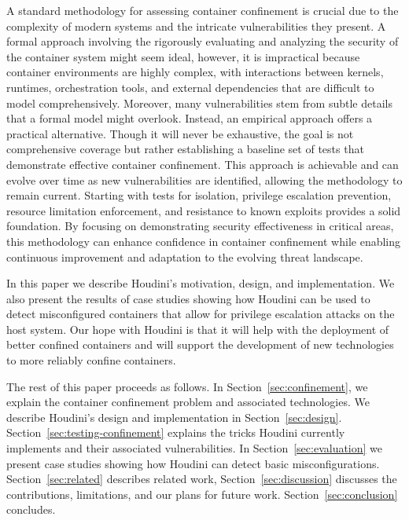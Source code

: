 A standard methodology for assessing container confinement is crucial due to the complexity of modern systems and the intricate vulnerabilities they present. A formal approach involving the rigorously evaluating and analyzing the security of the container system might seem ideal, however, it is impractical because container environments are highly complex, with interactions between kernels, runtimes, orchestration tools, and external dependencies that are difficult to model comprehensively. Moreover, many vulnerabilities stem from subtle details that a formal model might overlook. Instead, an empirical approach offers a practical alternative. Though it will never be exhaustive, the goal is not comprehensive coverage but rather establishing a baseline set of tests that demonstrate effective container confinement. This approach is achievable and can evolve over time as new vulnerabilities are identified, allowing the methodology to remain current. Starting with tests for isolation, privilege escalation prevention, resource limitation enforcement, and resistance to known exploits provides a solid foundation. By focusing on demonstrating security effectiveness in critical areas, this methodology can enhance confidence in container confinement while enabling continuous improvement and adaptation to the evolving threat landscape.

In this paper we describe Houdini's motivation, design, and implementation. We also present the results of case studies showing how Houdini can be used to detect misconfigured containers that allow for privilege escalation attacks on the host system. Our hope with Houdini is that it will help with the deployment of better confined containers and will support the development of new technologies to more reliably confine containers.

The rest of this paper proceeds as follows. In Section~\ref{sec:confinement}, we explain the container confinement problem and associated technologies.  We describe Houdini's design and implementation in Section~\ref{sec:design}. Section~\ref{sec:testing-confinement} explains the tricks Houdini currently implements and their associated vulnerabilities.  In Section~\ref{sec:evaluation} we present case studies showing how Houdini can detect basic misconfigurations.  Section~\ref{sec:related} describes related work, Section~\ref{sec:discussion} discusses the contributions, limitations, and our plans for future work.  Section~\ref{sec:conclusion} concludes.



